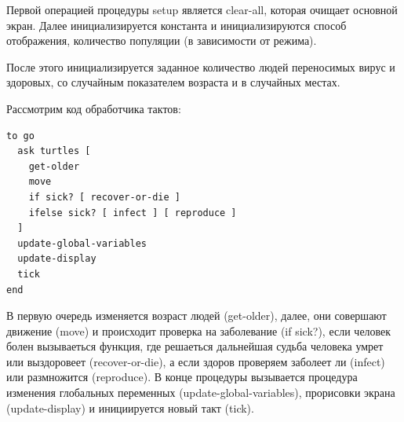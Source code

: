 \documentclass[14pt,a4paper,report]{report}
\begin{document}
Первой операцией процедуры setup является clear-all, которая очищает основной экран. Далее инициализируется константа и инициализируются способ отображения, количество популяции (в зависимости от режима).

После этого инициализируется заданное количество людей переносимых вирус и здоровых, со случайным показателем возраста и в случайных местах.

Рассмотрим код обработчика тактов:

\begin{verbatim}
to go
  ask turtles [
    get-older
    move
    if sick? [ recover-or-die ]
    ifelse sick? [ infect ] [ reproduce ]
  ]
  update-global-variables
  update-display
  tick
end

\end{verbatim}

В первую очередь изменяется возраст людей (get-older), далее, они совершают движение (move) и происходит проверка на заболевание (if sick?), если человек болен вызываеться функция, где решаеться дальнейшая судьба человека умрет или выздоровеет (recover-or-die), а если здоров проверяем заболеет ли (infect) или размножится (reproduce).
В конце процедуры вызывается процедура изменения глобальных переменных (update-global-variables), прорисовки экрана (update-display) и инициируется новый такт (tick).
\end{document}
